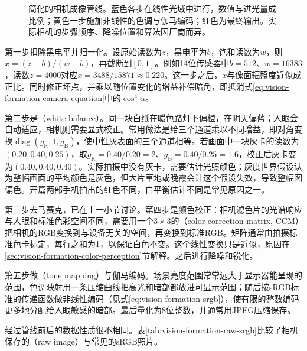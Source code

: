 \begin{figure}[htbp]
  \centering
  
  \caption{简化的相机成像管线。蓝色各步在线性光域中进行，数值与进光量成比例；黄色一步施加非线性的色调与伽马编码；红色为最终输出。实际相机的步骤顺序、降噪位置和算法因厂商而异。}
  \label{fig:vision-formation-isp}
\end{figure}

第一步扣除黑电平并归一化。设原始读数为$z$，黑电平为$b$，饱和读数为$w$，则$x=(z-b)/(w-b)$，再截断到$[0,1]$。例如14位传感器中$b=512$、$w=16383$，读数$z=4000$对应$x=3488/15871\approx0.220$。这一步之后，$x$与像面辐照度近似成正比。同时修正坏点，并乘以随位置变化的增益补偿暗角，即抵消式\eqref{eq:vision-formation-camera-equation}中的$\cos^4\alpha$。

第二步是（white balance）。同一块白纸在暖色路灯下偏橙，在阴天偏蓝；人眼会自动适应，相机则需要显式校正。常用做法是给三个通道乘以不同增益，即对角变换$\operatorname{diag}(g_{\mathrm R},1,g_{\mathrm B})$，使中性灰表面的三个通道相等。若画面中一块灰卡的读数为$(0.20,0.40,0.25)$，取$g_{\mathrm R}=0.40/0.20=2$、$g_{\mathrm B}=0.40/0.25=1.6$，校正后灰卡变为$(0.40,0.40,0.40)$。实际拍摄中没有灰卡，需要估计光照颜色；灰度世界假设认为整幅画面的平均颜色是灰色，但大片草地或晚霞会让这个假设失效，导致整幅图偏色。开篇两部手机拍出的红色不同，白平衡估计不同是常见原因之一。

第三步去马赛克，已在上一小节讨论。第四步是颜色校正：相机滤色片的光谱响应与人眼和标准色彩空间不同，需要用一个$3\times3$的（color correction matrix, CCM）把相机的RGB变换到与设备无关的空间，再变换到标准RGB。矩阵通常由拍摄标准色卡标定，每行之和为1，以保证白色不变。这个线性变换只是近似，原因在\ref{sec:vision-formation-color-perception}节解释。之后进行降噪和锐化。

第五步做（tone mapping）与伽马编码。场景亮度范围常常远大于显示器能呈现的范围，色调映射用一条压缩曲线把高光和暗部都放进可显示范围；随后按sRGB标准的传递函数做非线性编码（见式\eqref{eq:vision-formation-srgb}），使有限的整数编码更多地分配给人眼敏感的暗部。最后量化为8位整数，并通常用JPEG压缩保存。

经过管线前后的数据性质很不相同。表\ref{tab:vision-formation-raw-srgb}比较了相机保存的（raw image）与常见的sRGB照片。

